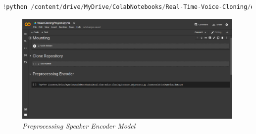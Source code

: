 \begin{enumerate}
\begin{lstlisting}[language=Python, caption=Script to Run Preprocessing Speaker Encoder Model]
!python /content/drive/MyDrive/ColabNotebooks/Real-Time-Voice-Cloning/encoder_preprocess.py /content/drive/MyDrive/dataset
\end{lstlisting}

\begin{figure}[H]
    \centering
    \includegraphics[scale=0.35]{figures/colab8}
    \caption{\textit{Preprocessing Speaker Encoder Model}}
    \label{colab8}
\end{figure}

\end{enumerate}